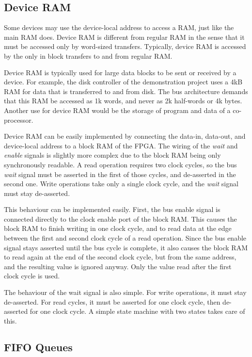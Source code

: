 \subsection{Device RAM}

Some devices may use the device-local address to access a RAM, just like the main RAM does. Device RAM is different from regular RAM in the sense that it must be accessed only by word-sized transfers. Typically, device RAM is accessed by the \eco only in block transfers to and from regular RAM.

Device RAM is typically used for large data blocks to be sent or received by a device. For example, the disk controller of the demonstration project uses a 4kB RAM for data that is transferred to and from disk. The bus architecture demands that this RAM be accessed as 1k words, and never as 2k half-words or 4k bytes. Another use for device RAM would be the storage of program and data of a co-processor.

Device RAM can be easily implemented by connecting the data-in, data-out, and device-local address to a block RAM of the FPGA. The wiring of the {\it wait} and {\it enable} signals is slightly more complex due to the block RAM being only synchronously readable. A read operation requires two clock cycles, so the bus {\it wait} signal must be asserted in the first of those cycles, and de-asserted in the second one. Write operations take only a single clock cycle, and the {\it wait} signal must stay de-asserted.

This behaviour can be implemented easily. First, the bus enable signal is connected directly to the clock enable port of the block RAM. This causes the block RAM to finish writing in one clock cycle, and to read data at the edge between the first and second clock cycle of a read operation. Since the bus enable signal stays asserted until the bus cycle is complete, it also causes the block RAM to read again at the end of the second clock cycle, but from the same address, and the resulting value is ignored anyway. Only the value read after the first clock cycle is used.

The behaviour of the wait signal is also simple. For write operations, it must stay de-asserted. For read cycles, it must be asserted for one clock cycle, then de-asserted for one clock cycle. A simple state machine with two states takes care of this.

\subsection{FIFO Queues}

